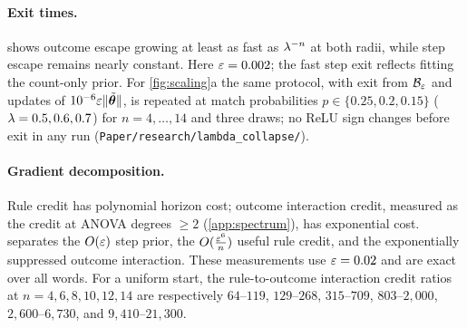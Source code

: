 \paragraph{Exit times.}  shows outcome escape growing at least as fast as
$\lambda^{-n}$ at both radii, while step escape remains nearly constant. Here $\initscale=0.002$; the fast step exit reflects fitting the
count-only prior. For \cref{fig:scaling}a the same protocol, with exit from $\mathcal B_{\varepsilon}$ and updates of $10^{-6}\varepsilon\|\tilde{\bm\theta}\|$, is
repeated at match probabilities $p\in\{0.25,0.2,0.15\}$ ($\lambda=0.5,0.6,0.7$) for $n=4,\ldots,14$ and three draws; no ReLU sign changes
before exit in any run (\texttt{Paper/research/lambda\_collapse/}).

\begin{table}[H]
\centering\small
{}
\caption{\textbf{Outcome escape grows exponentially while step escape stays nearly constant.} $\initscale=0.002$, zero readout;
ranges are over three draws.}
\label{tab:exit-times}
\end{table}
\paragraph{Gradient decomposition.} Rule credit has polynomial horizon cost; outcome interaction credit, measured as the credit at ANOVA degrees $\ge2$ (\cref{app:spectrum}), has exponential cost.
 separates the $O(\varepsilon)$ step prior, the $O(\frac{\varepsilon^6}{n})$ useful rule credit, and the exponentially
suppressed outcome interaction. These measurements use $\varepsilon=0.02$ and are exact over all words.
For a uniform start, the rule-to-outcome interaction credit ratios at $n=4,6,8,10,12,14$ are respectively
$64$--$119$, $129$--$268$, $315$--$709$, $803$--$2{,}000$, $2{,}600$--$6{,}730$, and $9{,}410$--$21{,}300$.


